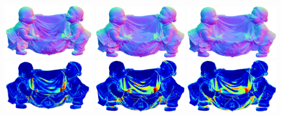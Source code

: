     \\
    \vspace{-0.5em}
    \makebox[0.30\textwidth]{\footnotesize } 
    \\
    \vspace{0.5em}
    \\
    \includegraphics[width=0.30\textwidth]{ch-psfcn/images/Results/DiLiGenT/IS18/harvest_normal.png}
    \includegraphics[width=0.30\textwidth]{ch-psfcn/images/Results/DiLiGenT/HS17/harvestPNGPAMI16Hui_normal.png}
    \includegraphics[width=0.30\textwidth]{ch-psfcn/images/Results/DiLiGenT/DPSN/harvest_normal.png}
    \\
    \includegraphics[width=0.30\textwidth]{ch-psfcn/images/Results/DiLiGenT/IS18/harvest_diff.png}
    \includegraphics[width=0.30\textwidth]{ch-psfcn/images/Results/DiLiGenT/HS17/harvestPNGPAMI16Hui_diff.png}
    \includegraphics[width=0.30\textwidth]{ch-psfcn/images/Results/DiLiGenT/DPSN/harvest_diff.png}
